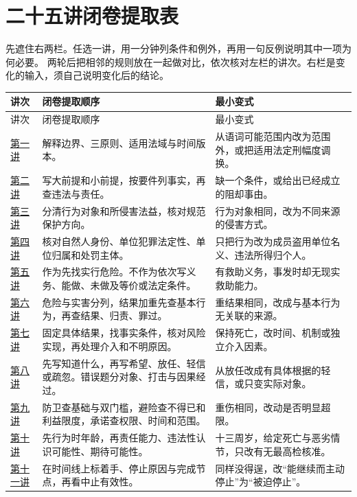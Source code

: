 \chapter{二十五讲闭卷提取表}

先遮住右两栏。任选一讲，用一分钟列条件和例外，再用一句反例说明其中一项为何必要。
两轮后把相邻的规则放在一起做对比，依次核对左栏的讲次。右栏是变化的输入，须自己说明变化后的结论。

\begingroup
\renewcommand{\arraystretch}{1.3}
\begin{longtable}{@{}p{.12\linewidth}p{.42\linewidth}p{.40\linewidth}@{}}
\toprule
讲次 & 闭卷提取顺序 & 最小变式\\
\midrule
\endfirsthead
\toprule
讲次 & 闭卷提取顺序 & 最小变式\\
\midrule
\endhead
\bottomrule
\endfoot
\hyperref[lecture:01]{第一讲} & 解释边界、三原则、适用法域与时间版本。 & 从语词可能范围内改为范围外，或把适用法定刑幅度调换。\\
\hyperref[lecture:02]{第二讲} & 写大前提和小前提，按要件列事实，再查违法与责任。 & 缺一个条件，或给出已经成立的阻却事由。\\
\hyperref[lecture:03]{第三讲} & 分清行为对象和所侵害法益，核对规范保护方向。 & 行为对象相同，改为不同来源的侵害方式。\\
\hyperref[lecture:04]{第四讲} & 核对自然人身份、单位犯罪法定性、单位归属和处罚主体。 & 只把行为改为成员盗用单位名义、违法所得归个人。\\
\hyperref[lecture:05]{第五讲} & 作为先找实行危险。不作为依次写义务、能做、未做及等价或法定条件。 & 有救助义务，事发时却无现实救助能力。\\
\hyperref[lecture:06]{第六讲} & 危险与实害分列，结果加重先查基本行为，再查结果、归责、罪过。 & 重结果相同，改成与基本行为无关联的来源。\\
\hyperref[lecture:07]{第七讲} & 固定具体结果，找事实条件，核对风险实现，再处理介入和不明原因。 & 保持死亡，改时间、机制或独立介入因素。\\
\hyperref[lecture:08]{第八讲} & 先写知道什么，再写希望、放任、轻信或疏忽。错误题分对象、打击与因果经过。 & 从放任改成有具体根据的轻信，或只变实际对象。\\
\hyperref[lecture:09]{第九讲} & 防卫查基础与双门槛，避险查不得已和利益限度，承诺查权限、时间和范围。 & 重伤相同，改动是否明显超限。\\
\hyperref[lecture:10]{第十讲} & 先行为时年龄，再责任能力、违法性认识可能性、期待可能性。 & 十三周岁，给定死亡与恶劣情节，只改有无最高检核准。\\
\hyperref[lecture:11]{第十一讲} & 在时间线上标着手、停止原因与完成节点，再看中止有效性。 & 同样没得逞，改“能继续而主动停止”为“被迫停止”。\\

\end{longtable}
